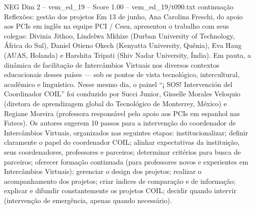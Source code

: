 \begin{textsample}{NEG Dim 2 – vem\_ed\_19 – Score 1.00 – vem\_ed\_19/t090.txt}  \label{ex:f2_neg_049}
continuação Reflexões: gestão dos projetos Em 13 de junho, Ana Carolina Freschi, do apoio aos PCIs em inglês na equipe PCI / Cesu, apresentou o trabalho com seus colegas: Divinia Jithoo, Lindelwa Mkhize (Durban University of Technology, África do Sul), Daniel Otieno Okech (Kenyatta University, Quênia), Eva Haug (AUAS, Holanda) e Harshita Tripati (Shiv Nadar University, Índia).
Em pauta, a dinâmica de facilitação de Intercâmbios Virtuais nos diversos contextos educacionais desses países — sob os pontos de vista tecnológico, intercultural, acadêmico e linguístico.
Nesse mesmo dia, o painel “¡ SOS!
Intervención del Coordinador COIL” foi conduzido por Succi Junior, Gisselle Morales Veloquio (diretora de aprendizagem global do Tecnológico de Monterrey, México) e Regiane Moreira (professora responsável pelo apoio aos PCIs em espanhol nas Fatecs).
Os autores sugerem 10 passos para a intervenção do coordenador de Intercâmbios Virtuais, organizados nas seguintes etapas: institucionalizar; definir claramente o papel do coordenador COIL; alinhar expectativas da instituição, seus coordenadores, professores e parceiros; determinar critérios para busca de parceiros; oferecer formação continuada (para professores novos e experientes em Intercâmbios Virtuais); gerenciar o design dos projetos; realizar o acompanhamento dos projetos; criar índices de comparação e de informação; explicar e difundir constantemente os projetos COIL; decidir quando intervir (intervenção de emergência, apenas quando necessário).

\end{textsample}
